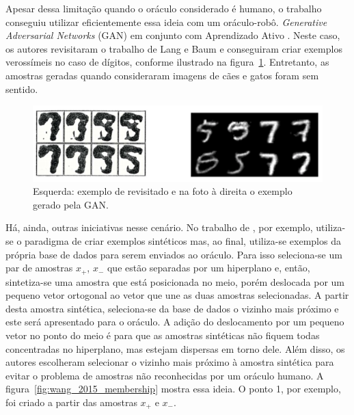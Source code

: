 Apesar dessa limitação quando o oráculo considerado é humano, o trabalho \citep{king2004functional, king2009automation} conseguiu utilizar eficientemente essa ideia com um oráculo-robô.  \emph{Generative Adversarial Networks} (GAN) em conjunto com Aprendizado Ativo \citep{zhu2017generative}. Neste caso, os autores revisitaram o trabalho de Lang e Baum e conseguiram criar exemplos verossímeis no caso de dígitos, conforme ilustrado na figura~\ref{fig:GAN_5_vs_9}. Entretanto, as amostras geradas quando consideraram imagens de cães e gatos foram sem sentido. 

\begin{figure}
  \centering
  \includegraphics[width=.9\textwidth]{figures/generative_GAN_AL_5_vs_9.png}
  \caption{Esquerda: exemplo de \cite{baum1992query} revisitado e na foto à direita o exemplo gerado pela GAN. \citep{zhu2017generative}}
  \label{fig:GAN_5_vs_9}
\end{figure}

Há, ainda, outras iniciativas nesse cenário. No trabalho de \citep{wang2015active}, por exemplo, utiliza-se o paradigma de criar exemplos sintéticos mas, ao final, utiliza-se exemplos da própria base de dados para serem enviados ao oráculo. Para isso seleciona-se um par de amostras {$x_+$, $x_-$} que estão separadas por um hiperplano e, então, sintetiza-se uma amostra que está posicionada no meio, porém deslocada por um pequeno vetor ortogonal ao vetor que une as duas amostras selecionadas. A partir desta amostra sintética, seleciona-se da base de dados o vizinho mais próximo e este será apresentado para o oráculo. A adição do deslocamento por um pequeno vetor no ponto do meio é para que as amostras sintéticas não fiquem todas concentradas no hiperplano, mas estejam dispersas em torno dele. Além disso, os autores escolheram selecionar o vizinho mais próximo à amostra sintética para evitar o problema de amostras não reconhecidas por um oráculo humano. A figura~\ref{fig:wang_2015_membership}  mostra essa ideia. O ponto 1, por exemplo, foi criado a partir das amostras $x_+$ e $x_-$. %

